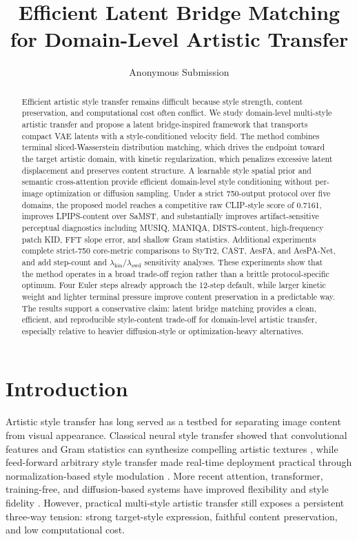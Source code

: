 ﻿\documentclass[letterpaper]{article}
\title{Efficient Latent Bridge Matching for Domain-Level Artistic Transfer}
\author{Anonymous Submission}
\begin{document}
\maketitle

\begin{abstract}
Efficient artistic style transfer remains difficult because style strength, content preservation, and computational cost often conflict. We study domain-level multi-style artistic transfer and propose a latent bridge-inspired framework that transports compact VAE latents with a style-conditioned velocity field. The method combines terminal sliced-Wasserstein distribution matching, which drives the endpoint toward the target artistic domain, with kinetic regularization, which penalizes excessive latent displacement and preserves content structure. A learnable style spatial prior and semantic cross-attention provide efficient domain-level style conditioning without per-image optimization or diffusion sampling. Under a strict 750-output protocol over five domains, the proposed model reaches a competitive raw CLIP-style score of 0.7161, improves LPIPS-content over SaMST, and substantially improves artifact-sensitive perceptual diagnostics including MUSIQ, MANIQA, DISTS-content, high-frequency patch KID, FFT slope error, and shallow Gram statistics. Additional experiments complete strict-750 core-metric comparisons to StyTr2, CAST, AesFA, and AesPA-Net, and add step-count and $\lambda_{\mathrm{kin}}/\lambda_{\mathrm{swd}}$ sensitivity analyses. These experiments show that the method operates in a broad trade-off region rather than a brittle protocol-specific optimum. Four Euler steps already approach the 12-step default, while larger kinetic weight and lighter terminal pressure improve content preservation in a predictable way. The results support a conservative claim: latent bridge matching provides a clean, efficient, and reproducible style-content trade-off for domain-level artistic transfer, especially relative to heavier diffusion-style or optimization-heavy alternatives.
\end{abstract}

\section{Introduction}
Artistic style transfer has long served as a testbed for separating image content from visual appearance. Classical neural style transfer showed that convolutional features and Gram statistics can synthesize compelling artistic textures \cite{gatys2016image}, while feed-forward arbitrary style transfer made real-time deployment practical through normalization-based style modulation \cite{huang2017adain}. More recent attention, transformer, training-free, and diffusion-based systems have improved flexibility and style fidelity \cite{park2019sanet,deng2022stytr2,hong2023aespa,huang2024aesfa,gim2024cast,chung2024styleid}. However, practical multi-style artistic transfer still exposes a persistent three-way tension: strong target-style expression, faithful content preservation, and low computational cost.
\end{document}
